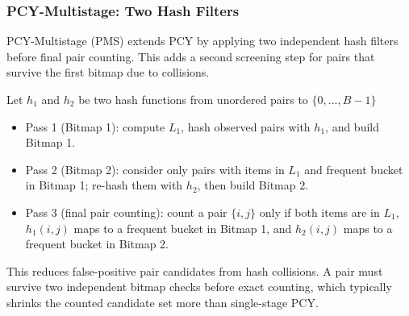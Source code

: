 \documentclass{article}  %
\begin{document}
\subsubsection{PCY-Multistage: Two Hash Filters}

PCY-Multistage (PMS) extends PCY by applying two independent hash filters before final pair counting. This adds a second screening step for pairs that survive the first bitmap due to collisions.

Let \(h_1\) and \(h_2\) be two hash functions from unordered pairs to \(\{0, \dots, B-1\}\) \mbox{}\\
\begin{itemize}
    \item Pass 1 (Bitmap 1): compute \(L_1\), hash observed pairs with \(h_1\), and build Bitmap 1.
    \item Pass 2 (Bitmap 2): consider only pairs with items in \(L_1\) and frequent bucket in Bitmap 1; re-hash them with \(h_2\), then build Bitmap 2.
    \item Pass 3 (final pair counting): count a pair \(\{i,j\}\) only if both items are in \(L_1\), \(h_1(i,j)\) maps to a frequent bucket in Bitmap 1, and \(h_2(i,j)\) maps to a frequent bucket in Bitmap 2.
\end{itemize}

This reduces false-positive pair candidates from hash collisions. A pair must survive two independent bitmap checks before exact counting, which typically shrinks the counted candidate set more than single-stage PCY.
\end{document}
